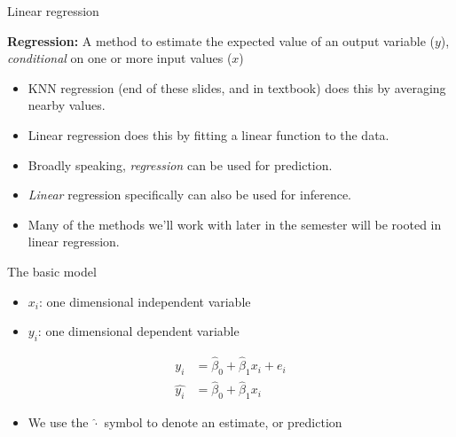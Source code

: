 \documentclass[aspectratio=169, handout]{beamer}
\begin{document}
\begin{frame}{Linear regression}

\textbf{Regression:} A method to estimate the expected value of an output variable ($y$), \textit{conditional} on one or more input values ($x$)

\begin{itemize}
\item KNN regression (end of these slides, and in textbook) does this by averaging nearby values.

\item Linear regression does this by fitting a linear function to the data.

\item Broadly speaking, \textit{regression} can be used for prediction.

\item \textit{Linear} regression specifically can also be used for inference.

\item Many of the methods we'll work with later in the semester will be rooted in linear regression.
\end{itemize}

\end{frame}

\begin{frame}{The basic model}

\begin{itemize}
\item $x_i$: one dimensional independent variable 
\item $y_i$: one dimensional dependent variable
\end{itemize}

\begin{align*}
y_i &= \hat{\beta}_0 + \hat{\beta}_1 x_i + e_i\\
\hat{y_i} &= \hat{\beta}_0 + \hat{\beta}_1 x_i
\end{align*}

\begin{itemize}
\item We use the $\hat{\cdot}$ symbol to denote an estimate, or prediction
\end{itemize}
\end{frame}
\end{document}
